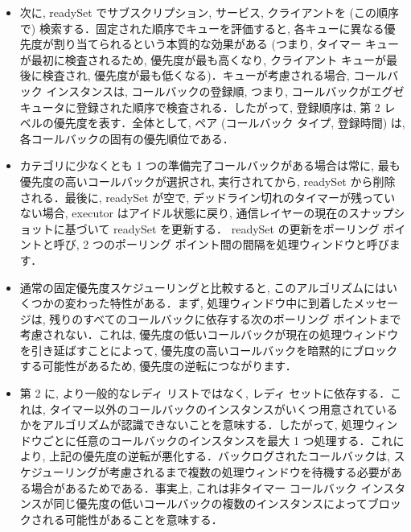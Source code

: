 \begin{frame}{}
    \begin{itemize}
        \item 次に, readySet でサブスクリプション, サービス, クライアントを (この順序で) 検索する．固定された順序でキューを評価すると, 各キューに異なる優先度が割り当てられるという本質的な効果がある (つまり, タイマー キューが最初に検査されるため, 優先度が最も高くなり, クライアント キューが最後に検査され, 優先度が最も低くなる)．キューが考慮される場合, コールバック インスタンスは, コールバックの登録順, つまり, コールバックがエグゼキュータに登録された順序で検査される．したがって, 登録順序は, 第 2 レベルの優先度を表す．全体として, ペア (コールバック タイプ, 登録時間) は, 各コールバックの固有の優先順位である．
    \end{itemize}
\end{frame}

\begin{frame}{}
    \begin{itemize}
        \item カテゴリに少なくとも 1 つの準備完了コールバックがある場合は常に, 最も優先度の高いコールバックが選択され, 実行されてから, readySet から削除される．最後に, readySet が空で, デッドライン切れのタイマーが残っていない場合, executor はアイドル状態に戻り, 通信レイヤーの現在のスナップショットに基づいて readySet を更新する． readySet の更新をポーリング ポイントと呼び, 2 つのポーリング ポイント間の間隔を処理ウィンドウと呼びます．
    \end{itemize}
\end{frame}

\begin{frame}{}
    \begin{itemize}
        \item 通常の固定優先度スケジューリングと比較すると, このアルゴリズムにはいくつかの変わった特性がある．まず, 処理ウィンドウ中に到着したメッセージは, 残りのすべてのコールバックに依存する次のポーリング ポイントまで考慮されない．これは, 優先度の低いコールバックが現在の処理ウィンドウを引き延ばすことによって, 優先度の高いコールバックを暗黙的にブロックする可能性があるため, 優先度の逆転につながります．
    \end{itemize}
\end{frame}

\begin{frame}{}
    \begin{itemize}
        \item 第 2 に, より一般的なレディ リストではなく, レディ セットに依存する．これは, タイマー以外のコールバックのインスタンスがいくつ用意されているかをアルゴリズムが認識できないことを意味する．したがって, 処理ウィンドウごとに任意のコールバックのインスタンスを最大 1 つ処理する．これにより, 上記の優先度の逆転が悪化する．バックログされたコールバックは, スケジューリングが考慮されるまで複数の処理ウィンドウを待機する必要がある場合があるためである．事実上, これは非タイマー コールバック インスタンスが同じ優先度の低いコールバックの複数のインスタンスによってブロックされる可能性があることを意味する．
    \end{itemize}
\end{frame}


